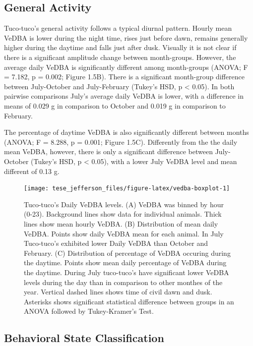 \documentclass[english,msc,numbers,hidelinks]{coppe}
\begin{document}
  \hypertarget{general-activity-1}{%
  \subsection{General Activity}\label{general-activity-1}}

  Tuco-tuco's general activity follows a typical diurnal pattern. Hourly mean VeDBA is lower during the night time, rises just before dawn, remains generally higher during the daytime and falls just after dusk. Visually it is not clear if there is a significant amplitude change between month-groups. However, the average daily VeDBA is significantly different among month-groups (ANOVA; F = 7.182, p = 0.002; Figure 1.5B). There is a significant month-group difference between July-October and July-February (Tukey's HSD, p \textless{} 0.05). In both pairwise comparisons July's average daily VeDBA is lower, with a difference in means of 0.029 g in comparison to October and 0.019 g in comparison to February.

  The percentage of daytime VeDBA is also significantly different between months (ANOVA; F = 8.288, p = 0.001; Figure 1.5C). Differently from the the daily mean VeDBA, however, there is only a significant difference between July-October (Tukey's HSD, p \textless{} 0.05), with a lower July VeDBA level and mean different of 0.13 g.\newline
  \begin{figure}[H]

  {\centering \texttt{[image: tese\_jefferson\_files/figure-latex/vedba-boxplot-1]} 

  }

  \caption{Tuco-tuco's Daily VeDBA levels. (A) VeDBA was binned by hour (0-23). Background lines show data for individual animals. Thick lines show mean hourly VeDBA. (B) Distribution of mean daily VeDBA. Points show daily VeDBA mean for each animal. In July Tuco-tuco's exhibited lower Daily VeDBA than October and February. (C) Distribution of percentage of VeDBA occuring during the daytime. Points show mean daily percentage of VeDBA during the daytime. During July tuco-tuco's have significant lower VeDBA levels during the day than in comparison to other monthes of the year. Vertical dashed lines shows time of civil dawn and dusk. Asterisks shows significant statistical difference between groups in an ANOVA followed by Tukey-Kramer's Test.}\label{fig:vedba-boxplot}
  \end{figure}
  \hypertarget{behavioral-state-classification-1}{%
  \subsection{Behavioral State Classification}\label{behavioral-state-classification-1}}
\end{document}
